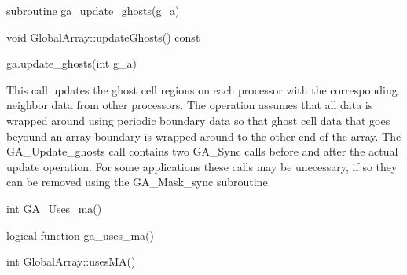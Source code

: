 \documentclass[12pt]{article}
\begin{document}
\begin{fapi}
\begin{fcode}
subroutine ga_update_ghosts(g_a)
\end{fcode}
\begin{funcargs}
\end{funcargs}
\end{fapi}

\begin{cxxapi}
\begin{cxxcode}
void GlobalArray::updateGhosts() const
\end{cxxcode}
\end{cxxapi}

\begin{pyapi}
\begin{pycode}
ga.update_ghosts(int g_a)
\end{pycode}
\begin{funcargs}
\end{funcargs}
\end{pyapi}

\gcoll

\begin{desc}

This call updates the ghost cell regions on each processor with the
corresponding neighbor data from other processors. The operation assumes that
all data is wrapped around using periodic boundary data so that ghost cell data
that goes beyound an array boundary is wrapped around to the other end of the
array. The GA_Update_ghosts call contains two GA_Sync calls before and after
the actual update operation. For some applications these calls may be
unecessary, if so they can be removed using the GA_Mask_sync subroutine.

\end{desc}


\begin{capi}
\begin{ccode}
int GA_Uses_ma()
\end{ccode}
\end{capi}

\begin{fapi}
\begin{fcode}
logical function ga_uses_ma()
\end{fcode}
\end{fapi}

\begin{cxxapi}
\begin{cxxcode}
int GlobalArray::usesMA()
\end{cxxcode}
\end{cxxapi}
\end{document}

